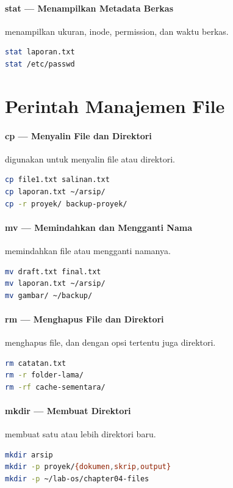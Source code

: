 \paragraph*{stat --- Menampilkan Metadata Berkas}
 menampilkan ukuran, inode, permission, dan waktu berkas.
\begin{lstlisting}[language=bash]
stat laporan.txt
stat /etc/passwd
\end{lstlisting}

\section{Perintah Manajemen File}

\paragraph*{cp --- Menyalin File dan Direktori}
 digunakan untuk menyalin file atau direktori.
\begin{lstlisting}[language=bash]
cp file1.txt salinan.txt
cp laporan.txt ~/arsip/
cp -r proyek/ backup-proyek/
\end{lstlisting}

\paragraph*{mv --- Memindahkan dan Mengganti Nama}
 memindahkan file atau mengganti namanya.
\begin{lstlisting}[language=bash]
mv draft.txt final.txt
mv laporan.txt ~/arsip/
mv gambar/ ~/backup/
\end{lstlisting}

\paragraph*{rm --- Menghapus File dan Direktori}
 menghapus file, dan dengan opsi tertentu juga direktori.
\begin{lstlisting}[language=bash]
rm catatan.txt
rm -r folder-lama/
rm -rf cache-sementara/
\end{lstlisting}

\paragraph*{mkdir --- Membuat Direktori}
 membuat satu atau lebih direktori baru.
\begin{lstlisting}[language=bash]
mkdir arsip
mkdir -p proyek/{dokumen,skrip,output}
mkdir -p ~/lab-os/chapter04-files
\end{lstlisting}

